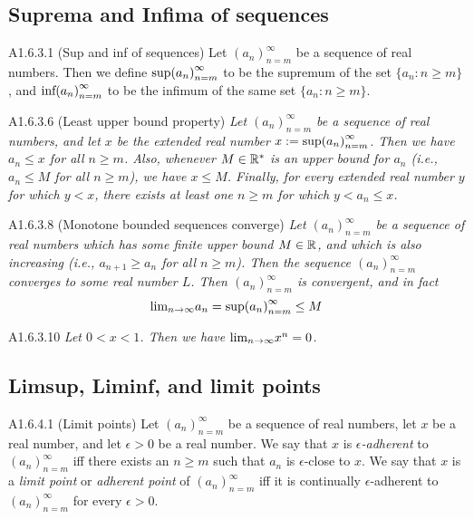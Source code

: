 \subsection{Suprema and Infima of sequences}
\begin{definition}{A1.6.3.1}
    (Sup and inf of sequences) Let $(a_n)_{n=m}^{\infty}$ be a sequence of real
    numbers. Then we define $\text{sup}{(a_n)}_{n=m}^{\infty}$ to be the supremum of the set
    $\{a_n: n \geq m\}$, and $\text{inf}{(a_n)}_{n=m}^{\infty}$ to be the infimum of the same set
    $\{a_n: n \geq m\}$.
\end{definition}

\begin{proposition}{A1.6.3.6}
    (Least upper bound property) \emph{Let $(a_n)_{n=m}^{\infty}$ be a sequence
    of real numbers, and let $x$ be the extended real number $x := \text{sup}{(a_n)}_{n=m}^{\infty}$.
    Then we have $a_n \leq x$ for all $n \geq m$. Also, whenever $M \in \mathbb{R}^*$
    is an upper bound for $a_n$ (i.e., $a_n \leq M$ for all $n \geq m$), we have
    $x \leq M$. Finally, for every extended real number $y$ for which $y < x$,
    there exists at least one $n \geq m$ for which $y < a_n \leq x$.}
\end{proposition}

\begin{proposition}{A1.6.3.8}
    (Monotone bounded sequences converge) \emph{Let $(a_n)_{n=m}^{\infty}$ be a
    sequence of real numbers which has some finite upper bound $M \in \mathbb{R}$,
    and which is also increasing (i.e., $a_{n+1} \geq a_n$ for all $n \geq m$).
    Then the sequence $(a_n)_{n=m}^{\infty}$ converges to some real number $L$.
    Then $(a_n)_{n=m}^{\infty}$ is convergent, and in fact
    \begin{equation*}
        \text{lim}_{n \rightarrow \infty}{a_n} = \text{sup}{(a_n)}_{n=m}^{\infty} \leq M
    \end{equation*}
    }
\end{proposition}

\begin{proposition}{A1.6.3.10}
    \emph{Let $0 < x < 1$. Then we have $\text{lim}_{n \rightarrow \infty}{x^n = 0}$.}
\end{proposition}

\subsection{Limsup, Liminf, and limit points}
\begin{definition}{A1.6.4.1}
    (Limit points) Let $(a_n)_{n=m}^{\infty}$ be a sequence of real numbers, let
    $x$ be a real number, and let $\epsilon > 0$ be a real number. We say that $x$
    is \emph{$\epsilon$-adherent} to $(a_n)_{n=m}^{\infty}$ iff there exists an
    $n \geq m$ such that $a_n$ is $\epsilon$-close to $x$. We say that $x$ is a
    \emph{limit point} or \emph{adherent point} of $(a_n)_{n=m}^{\infty}$ iff it
    is continually $\epsilon$-adherent to $(a_n)_{n=m}^{\infty}$ for every $\epsilon > 0$.
\end{definition}

